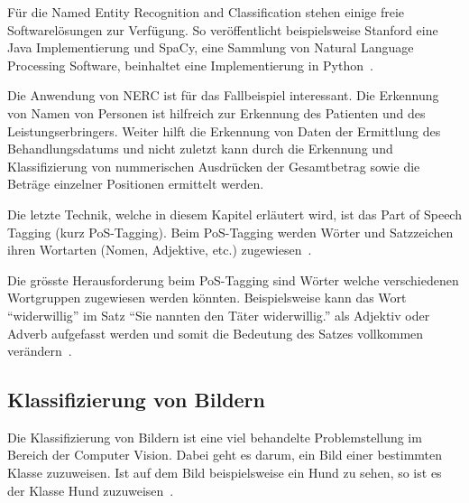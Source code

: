 Für die Named Entity Recognition and Classification stehen einige freie Softwarelösungen zur Verfügung. So veröffentlicht beispielsweise Stanford eine Java Implementierung und SpaCy, eine Sammlung von Natural Language Processing Software, beinhaltet eine Implementierung in Python~\autocite{StanfordNLPGroup, ExplosionAI}.

Die Anwendung von NERC ist für das Fallbeispiel interessant. Die Erkennung von Namen von Personen ist hilfreich zur Erkennung des Patienten und des Leistungserbringers. Weiter hilft die Erkennung von Daten der Ermittlung des Behandlungsdatums und nicht zuletzt kann durch die Erkennung und Klassifizierung von nummerischen Ausdrücken der Gesamtbetrag sowie die Beträge einzelner Positionen ermittelt werden.

Die letzte Technik, welche in diesem Kapitel erläutert wird, ist das Part of Speech Tagging (kurz PoS-Tagging). Beim PoS-Tagging werden Wörter und Satzzeichen ihren Wortarten (Nomen, Adjektive, etc.) zugewiesen~\autocite{Xiao2004}.

Die grösste Herausforderung beim PoS-Tagging sind Wörter welche verschiedenen Wortgruppen zugewiesen werden könnten. Beispielsweise kann das Wort \enquote{widerwillig} im Satz \enquote{Sie nannten den Täter widerwillig.} als Adjektiv oder Adverb aufgefasst werden und somit die Bedeutung des Satzes vollkommen verändern~\autocite{Volk}.




\subsection{Klassifizierung von Bildern}
\label{chap:object-detection}

Die Klassifizierung von Bildern ist eine viel behandelte Problemstellung im Bereich der Computer Vision. Dabei geht es darum, ein Bild einer bestimmten Klasse zuzuweisen. Ist auf dem Bild beispielsweise ein Hund zu sehen, so ist es der Klasse Hund zuzuweisen~\autocite{Goodfellow2016}.

